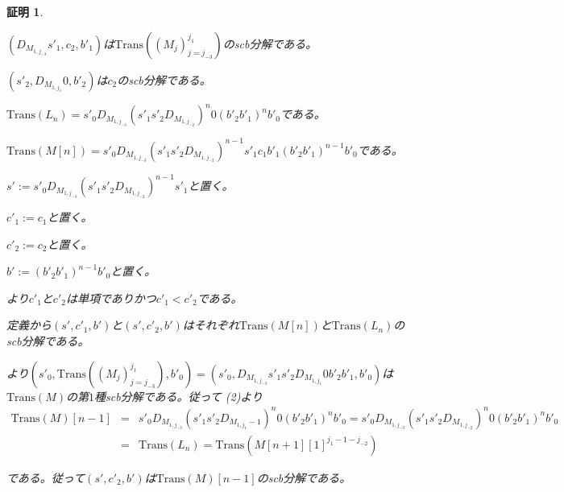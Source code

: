 \documentclass[dvipdfmx,uplatex]{jsarticle}
\newif\iffull
\theoremstyle{customnonumberbreakfortheorem}
\theoremstyle{customnonumberbreakforproof}
\newtheorem{hideableproof}{証明}
\newcommand{\qedhere}{\hfill\hideableproofSymbol}
\begin{document}
\begin{hideableproof}
\begin{indented}
\begin{penumerate}
			\item \((D_{M_{1,j_{-3}}} s'_1,c_2,b'_1)\)は\(\textrm{Trans}((M_j)_{j=j_{-3}}^{j_1})\)のscb分解である。
			\item \((s'_2,D_{M_{1,j_1}} 0,b'_2)\)は\(c_2\)のscb分解である。
			\setcounter{penumeratei}{4}
			\item \(\textrm{Trans}(L_n) = s'_0 D_{M_{1,j_{-3}}} (s'_1 s'_2 D_{M_{1,j_{-2}}})^n 0 (b'_2 b'_1)^n b'_0\)である。
			\item \(\textrm{Trans}(M[n]) = s'_0 D_{M_{1,j_{-3}}} (s'_1 s'_2 D_{M_{1,j_{-2}}})^{n-1} s'_1 c_1 b'_1 (b'_2 b'_1)^{n-1} b'_0\)である。
			\item[] \(s' := s'_0 D_{M_{1,j_{-3}}} (s'_1 s'_2 D_{M_{1,j_{-2}}})^{n-1} s'_1\)と置く。
			\item[] \(c'_1 := c_1\)と置く。
			\item[] \(c'_2 := c_2\)と置く。
			\item[] \(b' := (b'_2 b'_1)^{n-1} b'_0\)と置く。
			\item[] より\(c'_1\)と\(c'_2\)は単項でありかつ\(c'_1 < c'_2\)である。
			\item[] 定義から\((s',c'_1,b')\)と\((s',c'_2,b')\)はそれぞれ\(\textrm{Trans}(M[n])\)と\(\textrm{Trans}(L_n)\)のscb分解である。
			\item[] より\((s'_0,\textrm{Trans}((M_j)_{j=j_{-3}}^{j_1}),b'_0) = (s'_0,D_{M_{1,j_{-3}}} s'_1 s'_2 D_{M_{1,j_1}} 0 b'_2 b'_1,b'_0)\)は\(\textrm{Trans}(M)\)の第\(1\)種scb分解である。従って (2)より
			\begin{eqnarray*}
			\textrm{Trans}(M)[n-1] & = & s'_0 D_{M_{1,j_{-3}}} (s'_1 s'_2 D_{M_{1,j_1}-1})^n 0 (b'_2 b'_1)^n b'_0 = s'_0 D_{M_{1,j_{-3}}} (s'_1 s'_2 D_{M_{1,j_{-2}}})^n 0 (b'_2 b'_1)^n b'_0\\
			& = & \textrm{Trans}(L_n) = \textrm{Trans}(M[n+1][1]^{j_1-1-j_{-2}})
			\end{eqnarray*}
			\item[] である。従って\((s',c'_2,b')\)は\(\textrm{Trans}(M)[n-1]\)のscb分解である。\qedhere\NoEndMark
		\end{penumerate}
	\end{indented}
\end{hideableproof}

\iffull{それでは本題に戻る。}\fi
\end{document}
